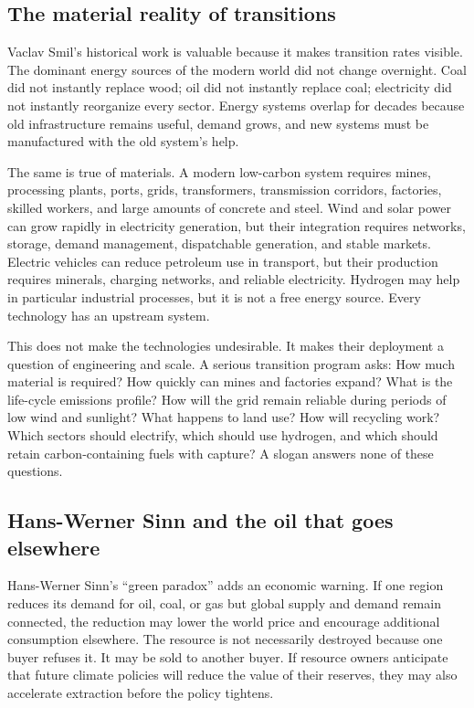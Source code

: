 ﻿\documentclass[12pt,a4paper]{book}
\begin{document}
\subsection{The material reality of transitions}
Vaclav Smil's historical work is valuable because it makes transition rates visible. The dominant energy sources of the modern world did not change overnight. Coal did not instantly replace wood; oil did not instantly replace coal; electricity did not instantly reorganize every sector. Energy systems overlap for decades because old infrastructure remains useful, demand grows, and new systems must be manufactured with the old system's help. \cite{Smil2021}

The same is true of materials. A modern low-carbon system requires mines, processing plants, ports, grids, transformers, transmission corridors, factories, skilled workers, and large amounts of concrete and steel. Wind and solar power can grow rapidly in electricity generation, but their integration requires networks, storage, demand management, dispatchable generation, and stable markets. Electric vehicles can reduce petroleum use in transport, but their production requires minerals, charging networks, and reliable electricity. Hydrogen may help in particular industrial processes, but it is not a free energy source. Every technology has an upstream system.

This does not make the technologies undesirable. It makes their deployment a question of engineering and scale. A serious transition program asks: How much material is required? How quickly can mines and factories expand? What is the life-cycle emissions profile? How will the grid remain reliable during periods of low wind and sunlight? What happens to land use? How will recycling work? Which sectors should electrify, which should use hydrogen, and which should retain carbon-containing fuels with capture? A slogan answers none of these questions.

\subsection{Hans-Werner Sinn and the oil that goes elsewhere}
Hans-Werner Sinn's ``green paradox'' adds an economic warning. If one region reduces its demand for oil, coal, or gas but global supply and demand remain connected, the reduction may lower the world price and encourage additional consumption elsewhere. The resource is not necessarily destroyed because one buyer refuses it. It may be sold to another buyer. If resource owners anticipate that future climate policies will reduce the value of their reserves, they may also accelerate extraction before the policy tightens. \cite{Sinn2015}
\end{document}

